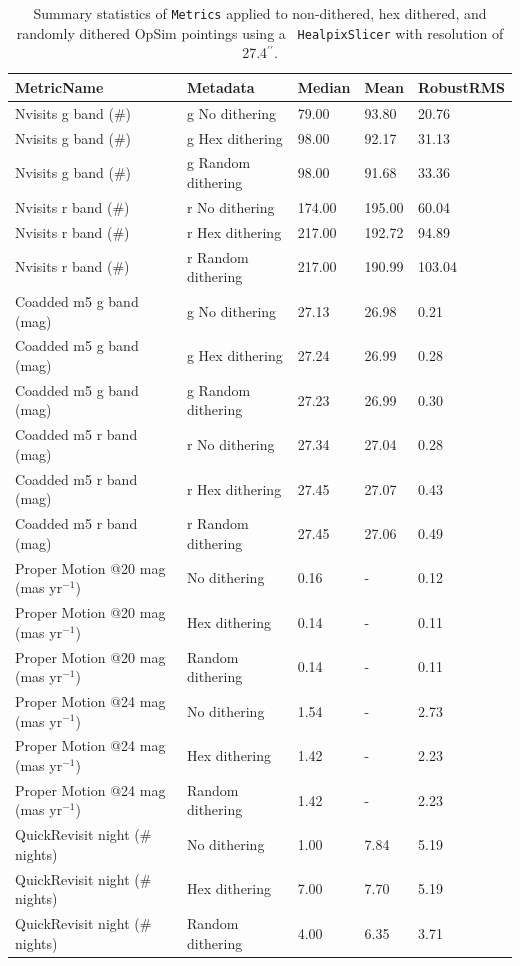 \documentclass[]{spie}  %
\def\arcsec{$^{\prime\prime}$}
\begin{document}
\begin{table}[]
\caption{Summary statistics of {\tt Metrics} applied to non-dithered,
  hex dithered, and randomly dithered OpSim pointings using a {\tt
    HealpixSlicer} with resolution of 27.4\arcsec.}
\label{tab:summarystats}
\begin{center}
\begin{tabular}{|l|l|l|l|l|}
\hline
MetricName &  Metadata &  Median &  Mean &  RobustRMS \\
\hline  
\hline 
Nvisits g band (\#)&  g No dithering & 79.00 & 93.80 & 20.76\\  
Nvisits g band (\#) &  g Hex dithering & 98.00 & 92.17 & 31.13\\ 
Nvisits g band (\#)&  g Random dithering & 98.00 & 91.68 & 33.36\\ 
Nvisits r band (\#)&  r No dithering & 174.00 & 195.00 & 60.04\\  
Nvisits r band (\#) &  r Hex dithering & 217.00 & 192.72 & 94.89\\ 
Nvisits r band (\#)&  r Random dithering & 217.00 & 190.99 & 103.04\\ 
\hline
Coadded m5 g band (mag) &  g No dithering & 27.13 & 26.98 & 0.21\\ 
Coadded m5 g band (mag)&  g Hex dithering & 27.24 & 26.99 & 0.28\\
Coadded m5 g band (mag)&  g Random dithering & 27.23 & 26.99 & 0.30\\
Coadded m5 r band (mag)&  r No dithering & 27.34 & 27.04 & 0.28\\ 
Coadded m5 r band (mag)&  r Hex dithering & 27.45 & 27.07 & 0.43\\
Coadded m5 r band (mag)&  r Random dithering & 27.45 & 27.06 & 0.49\\
\hline
Proper Motion @20 mag  (mas yr$^{-1}$)&   No dithering & 0.16 & - & 0.12\\ 
Proper Motion @20 mag  (mas yr$^{-1}$)&   Hex dithering & 0.14 & - & 0.11\\
Proper Motion @20 mag  (mas yr$^{-1}$)&   Random dithering & 0.14 & - & 0.11\\
Proper Motion @24 mag  (mas yr$^{-1}$)&   No dithering & 1.54 & - & 2.73\\ 
Proper Motion @24 mag  (mas yr$^{-1}$)&   Hex dithering & 1.42 & - & 2.23\\
Proper Motion @24 mag  (mas yr$^{-1}$)&   Random dithering & 1.42 & - & 2.23\\
\hline
QuickRevisit night (\# nights)&   No dithering & 1.00 & 7.84 & 5.19\\ 
QuickRevisit night (\# nights)&   Hex dithering & 7.00 & 7.70 & 5.19\\
QuickRevisit night (\# nights)&   Random dithering & 4.00 & 6.35 & 3.71\\
\hline
\end{tabular}
\end{center}
\end{table}
\end{document}
